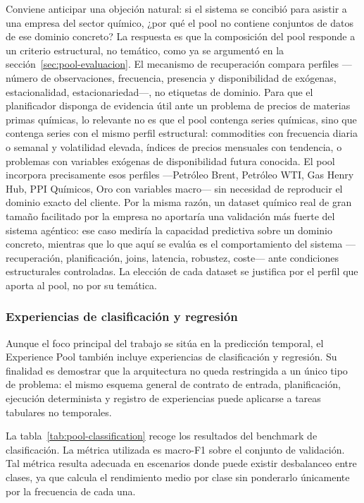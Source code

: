 \documentclass[12pt,a4paper]{article}
\theoremstyle{plain}
\begin{document}
Conviene anticipar una objeción natural: si el sistema se concibió para asistir a una empresa del sector químico, ¿por qué el pool no contiene conjuntos de datos de ese dominio concreto? La respuesta es que la composición del pool responde a un criterio estructural, no temático, como ya se argumentó en la sección~\ref{sec:pool-evaluacion}. El mecanismo de recuperación compara perfiles ---número de observaciones, frecuencia, presencia y disponibilidad de exógenas, estacionalidad, estacionariedad---, no etiquetas de dominio. Para que el planificador disponga de evidencia útil ante un problema de precios de materias primas químicas, lo relevante no es que el pool contenga series químicas, sino que contenga series con el mismo perfil estructural: commodities con frecuencia diaria o semanal y volatilidad elevada, índices de precios mensuales con tendencia, o problemas con variables exógenas de disponibilidad futura conocida. El pool incorpora precisamente esos perfiles ---Petróleo Brent, Petróleo WTI, Gas Henry Hub, PPI Químicos, Oro con variables macro--- sin necesidad de reproducir el dominio exacto del cliente. Por la misma razón, un dataset químico real de gran tamaño facilitado por la empresa no aportaría una validación más fuerte del sistema agéntico: ese caso mediría la capacidad predictiva sobre un dominio concreto, mientras que lo que aquí se evalúa es el comportamiento del sistema ---recuperación, planificación, joins, latencia, robustez, coste--- ante condiciones estructurales controladas. La elección de cada dataset se justifica por el perfil que aporta al pool, no por su temática.

\subsubsection{Experiencias de clasificación y regresión}
\label{sec:pool-clasif-regr}

Aunque el foco principal del trabajo se sitúa en la predicción temporal, el Experience Pool también incluye experiencias de clasificación y regresión. Su finalidad es demostrar que la arquitectura no queda restringida a un único tipo de problema: el mismo esquema general de contrato de entrada, planificación, ejecución determinista y registro de experiencias puede aplicarse a tareas tabulares no temporales.

La tabla~\ref{tab:pool-classification} recoge los resultados del benchmark de clasificación. La métrica utilizada es macro-F1 sobre el conjunto de validación. Tal métrica resulta adecuada en escenarios donde puede existir desbalanceo entre clases, ya que calcula el rendimiento medio por clase sin ponderarlo únicamente por la frecuencia de cada una.
\end{document}
